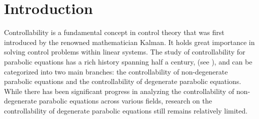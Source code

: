 \documentclass[9pt,reqno]{amsart}
\theoremstyle{plain}
\numberwithin{equation}{section}
\numberwithin{theorem}{section}
\begin{document}
	\pagestyle{myheadings}
	\thispagestyle{plain}
	
	
	
	\section{Introduction}
	Controllability is a fundamental concept in control theory that was first introduced by the renowned mathematician Kalman. It holds great importance in solving control problems within linear systems. The study of controllability for parabolic equations has a rich history spanning half a century, (see \cite{dolecki1977general,fattorini1971exact,fattorini1974uniform,russell1973unified,carleman1939probleme,hormander2013linear,hormander2009analysis,zuily1983uniqueness,lebeau1995controle,fursikov1996controllability,emanuilov1995controllability}), and can be categorized into two main branches: the controllability of non-degenerate parabolic equations and the controllability of degenerate parabolic equations. While there has been significant progress in analyzing the controllability of non-degenerate parabolic equations across various fields, research on the controllability of degenerate parabolic equations still remains relatively limited. 
	
\end{document}
